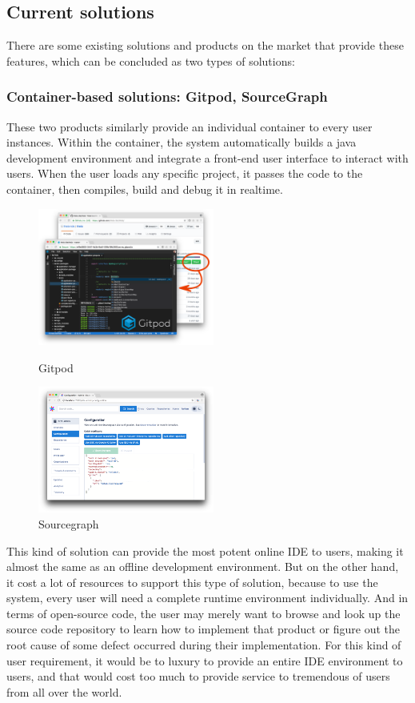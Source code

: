 \documentclass[runningheads]{llncs}
\begin{document}
\subsection{Current solutions}
There are some existing solutions and products on the market that provide these features, which can be concluded as two types of solutions:

\subsubsection{Container-based solutions: Gitpod\cite{Gitpod}, SourceGraph\cite{SourceGraph}}

These two products similarly provide an individual container to every user instances. Within the container, the system automatically builds a java development environment and integrate a front-end user interface to interact with users. When the user loads any specific project, it passes the code to the container, then compiles, build and debug it in realtime.

\begin{figure}[H]
	\centering
	\begin{minipage}[t]{0.48\textwidth}
	\centering
	\includegraphics[width=5.8cm]{pic/gitpod.png}
	\caption{Gitpod}
	\end{minipage}
	\begin{minipage}[t]{0.48\textwidth}
	\centering
	\includegraphics[width=5.8cm]{pic/sourcegraph.png}
	\caption{Sourcegraph}
	\end{minipage}
\end{figure}

This kind of solution can provide the most potent online IDE to users, making it almost the same as an offline development environment. But on the other hand, it cost a lot of resources to support this type of solution, because to use the system, every user will need a complete runtime environment individually. And in terms of open-source code, the user may merely want to browse and look up the source code repository to learn how to implement that product or figure out the root cause of some defect occurred during their implementation. For this kind of user requirement, it would be to luxury to provide an entire IDE environment to users, and that would cost too much to provide service to tremendous of users from all over the world.
\end{document}

